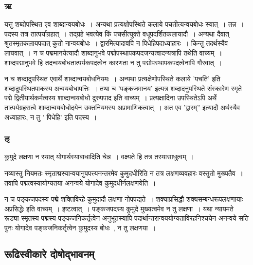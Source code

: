 			\subsubsection{ऋ}
			
				\begin{small}
				
					यत्तु शब्दोपस्थित एव शाब्दान्वयबोधः~। अन्यथा प्रत्यक्षोपस्थिते कलाये पचतीत्यन्वयबोधः स्यात्~। तन्न~। पदस्य तत्र तात्पर्याग्रहात्~। तद्ग्रहे भवत्येव किं पचसीत्युक्ते वधूपदर्शितकलायादौ~। अन्यथा दैवात् श्रुतस्मृतकलायपदात् कुतो नान्वयबोधः~। द्वारमित्यादावपि न पिधेहिपदाध्याहारः~। किन्तु तदर्थस्यैव लाघवात्~। न च पद्ममानयेत्यादौ शाब्दानुभवे पद्मोपस्थापकपदजन्यत्वादन्यत्रापि तथेति वाच्यम्~। शाब्दपद्मानुभवे हि तदन्वयबोधतात्पर्यकपदत्वेन कारणता न तु पद्मोपस्थापकपदत्वेनापि गौरवात्~। 
				\end{small}
			
				न च शब्दादुपस्थित एवार्थे शाब्दान्वयबोधनियमः~।  अन्यथा प्रत्यक्षेणोपस्थिते  कलाये ’पचति’ इति शब्दादुपस्थितपाकस्य अन्वयबोधापत्तिः~।  तथा च ’पङ्कजमानय’ इत्यत्र  शब्दादनुपस्थिते संस्कारेण स्मृते पद्मे द्वितीयार्थकर्मत्वस्य शाब्दान्वयबोधो दुरुपपाद इति वाच्यम्~। प्रत्यक्षादिना उपस्थितेऽपि अर्थे तात्पर्यग्रहसत्वे शाब्दान्वयबोधोदयेन उक्तनियमस्य अप्रामाणिकत्वात्~। अत एव ’द्वारम्” इत्यादौ अर्थस्यैव  अध्याहारः, न तु ’ पिधेहि’ इति पदस्य~।
			
			\subsubsection{ऌ}

				\begin{small}
				
					कुमुदे लक्षणा न स्यात् योगार्थस्याबाधादिति चेन्न~। वक्ष्यते हि तत्र तस्यासाधुत्वम्~। 
	
					नव्यास्तु नियमतः स्मृताद्मस्यान्वयानुपपत्त्यनन्तरमेव कुमुदधीरिति न तत्र लक्षणव्यवहारः वस्तुतो मुख्यतैव~। तवापि पद्मत्वस्यायोग्यतया अनन्वये योगादेव कुमुदधीर्नलक्षणयेति~। 
				\end{small}

				न च पङ्कजपदस्य पद्मे शक्तिविरहे कुमुदादौ लक्षणा नोपपद्यते~।  शक्याप्रसिद्धौ शक्यसम्बन्धरूपलक्षणायाः अप्रसिद्धेः इति वाच्यम्~। इष्टत्वात्~।  पङ्कजपदस्य कुमुदे मुख्यत्वमेव न तु लक्षणा~।  यथा न्यायमते रूड्या स्मृतस्य पद्मस्य पङ्कजनिकर्तृत्वेन  अनुभूतस्यापि पदार्थान्तरान्वययोग्यताविरहनिश्चयेन अनन्वये सति पुनः योगादेव पङ्कजनिकर्तृत्वेन कुमुदस्य बोधः~, न तु लक्षणया~। 
		
		\subsection{रूढिस्वीकारे दोषोद्भावनम्}
					
